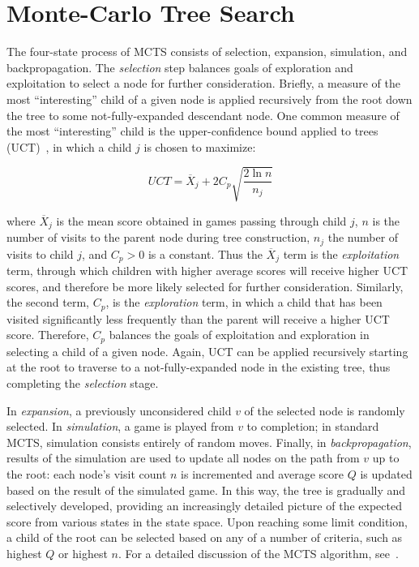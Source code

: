 \documentclass[letterpaper]{article}
\begin{document}
\section{Monte-Carlo Tree Search}

The four-state process of MCTS consists of selection, expansion, simulation, and backpropagation. The {\it selection} step balances goals of exploration and exploitation to select a node for further consideration. Briefly, a measure of the most ``interesting'' child of a given node is applied recursively from the root down the tree to some not-fully-expanded descendant node. One common measure of the most ``interesting'' child is the upper-confidence bound applied to trees (UCT)~\cite{kocsis2006improved}, in which a child $j$ is chosen to maximize:

\begin{equation} \label{eq:UCT}
UCT = \overline{X}_j + 2C_p\sqrt{\frac{2\ln{n}}{n_j}}
\end{equation}

\noindent where $\overline{X}_j$ is the mean score obtained in games passing through child $j$, $n$ is the number of visits to the parent node during tree construction, $n_j$ the number of visits to child $j$, and $C_p > 0$ is a constant. Thus the $\overline{X}_j$ term is the {\it exploitation} term, through which children with higher average scores will receive higher UCT scores, and therefore be more likely selected for further consideration. Similarly, the second term, $C_p$, is the {\it exploration} term, in which a child that has been visited significantly less frequently than the parent will receive a higher UCT score. Therefore, $C_p$ balances the goals of exploitation and exploration in selecting a child of a given node. Again, UCT can be applied recursively starting at the root to traverse to a not-fully-expanded node in the existing tree, thus completing the {\it selection} stage.

In {\it expansion}, a previously unconsidered child $v$ of the selected node is randomly selected. In {\it simulation}, a game is played from $v$ to completion; in standard MCTS, simulation consists entirely of random moves. Finally, in {\it backpropagation}, results of the simulation are used to update all nodes on the path from $v$ up to the root: each node's visit count $n$ is incremented and average score $Q$ is updated based on the result of the simulated game. In this way, the tree is gradually and selectively developed, providing an increasingly detailed picture of the expected score from various states in the state space. Upon reaching some limit condition, a child of the root can be selected based on any of a number of criteria, such as highest $Q$ or highest $n$. For a detailed discussion of the MCTS algorithm, see~\cite{browne2012survey}.
\end{document}
